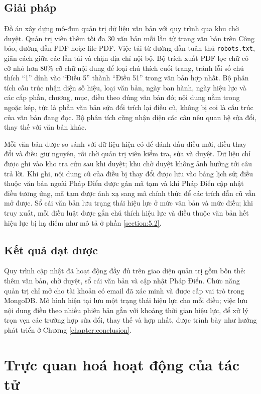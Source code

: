 \documentclass[../DoAn.tex]{subfiles}
\begin{document}
\subsection{Giải pháp}
Đồ án xây dựng mô-đun quản trị dữ liệu văn bản với quy trình qua khu chờ duyệt. Quản trị viên thêm tối đa 30 văn bản mỗi lần từ trang văn bản trên Công báo, đường dẫn PDF hoặc file PDF. Việc tải từ đường dẫn tuân thủ \texttt{robots.txt}, giãn cách giữa các lần tải và chặn địa chỉ nội bộ. Bộ trích xuất PDF lọc chữ có cỡ nhỏ hơn 80\% cỡ chữ nội dung để loại chú thích cuối trang, tránh lỗi số chú thích ``1'' dính vào ``Điều 5'' thành ``Điều 51'' trong văn bản hợp nhất. Bộ phân tích cấu trúc nhận diện số hiệu, loại văn bản, ngày ban hành, ngày hiệu lực và các cấp phần, chương, mục, điều theo đúng văn bản đó; nội dung nằm trong ngoặc kép, tức là phần văn bản sửa đổi trích lại điều cũ, không bị coi là cấu trúc của văn bản đang đọc. Bộ phân tích cũng nhận diện các câu nêu quan hệ sửa đổi, thay thế với văn bản khác.

Mỗi văn bản được so sánh với dữ liệu hiện có để đánh dấu điều mới, điều thay đổi và điều giữ nguyên, rồi chờ quản trị viên kiểm tra, sửa và duyệt. Dữ liệu chỉ được ghi vào kho tra cứu sau khi duyệt; khu chờ duyệt không ảnh hưởng tới câu trả lời. Khi ghi, nội dung cũ của điều bị thay đổi được lưu vào bảng lịch sử; điều thuộc văn bản ngoài Pháp Điển được gán mã tạm và khi Pháp Điển cập nhật điều tương ứng, mã tạm được ánh xạ sang mã chính thức để các trích dẫn cũ vẫn mở được. Sổ cái văn bản lưu trạng thái hiệu lực ở mức văn bản và mức điều; khi truy xuất, mỗi điều luật được gắn chú thích hiệu lực và điều thuộc văn bản hết hiệu lực bị hạ điểm như mô tả ở phần \ref{section:5.2}.

\subsection{Kết quả đạt được}
Quy trình cập nhật đã hoạt động đầy đủ trên giao diện quản trị gồm bốn thẻ: thêm văn bản, chờ duyệt, sổ cái văn bản và cập nhật Pháp Điển. Chức năng quản trị chỉ mở cho tài khoản có email đã xác minh và được cấp vai trò trong MongoDB. Mô hình hiện tại lưu một trạng thái hiệu lực cho mỗi điều; việc lưu nội dung điều theo nhiều phiên bản gắn với khoảng thời gian hiệu lực, để xử lý trọn vẹn các trường hợp sửa đổi, thay thế và hợp nhất, được trình bày như hướng phát triển ở Chương \ref{chapter:conclusion}.

\section{Trực quan hoá hoạt động của tác tử}
\label{section:5.6}
\end{document}
